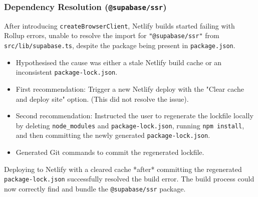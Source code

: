 \documentclass[11pt]{article} %
\begin{document}
\subsubsection{Dependency Resolution (\texttt{@supabase/ssr})}
\begin{description}[style=unboxed,leftmargin=0pt]
    \item[Problem:] After introducing \texttt{createBrowserClient}, Netlify builds started failing with Rollup errors, unable to resolve the import for \texttt{"@supabase/ssr"} from \texttt{src/lib/supabase.ts}, despite the package being present in \texttt{package.json}.
    \item[AI Assistance (Troubleshooting):]
        \begin{itemize}
            \item Hypothesised the cause was either a stale Netlify build cache or an inconsistent \texttt{package-lock.json}.
            \item First recommendation: Trigger a new Netlify deploy with the "Clear cache and deploy site" option. (This did not resolve the issue).
            \item Second recommendation: Instructed the user to regenerate the lockfile locally by deleting \texttt{node\_modules} and \texttt{package-lock.json}, running \texttt{npm install}, and then committing the newly generated \texttt{package-lock.json}.
            \item Generated Git commands to commit the regenerated lockfile.
        \end{itemize}
    \item[Outcome:] Deploying to Netlify with a cleared cache *after* committing the regenerated \texttt{package-lock.json} successfully resolved the build error. The build process could now correctly find and bundle the \texttt{@supabase/ssr} package.
\end{description}
\end{document}
